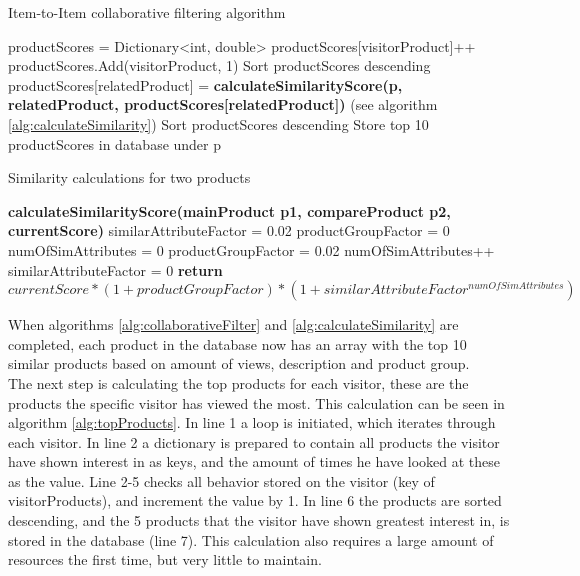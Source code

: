 \begin{algorithm}[H]
\caption{Item-to-Item collaborative filtering algorithm}
\label{alg:collaborativeFilter}
\begin{algorithmic}[1]
\State productScores = Dictionary<int, double>
\State productScores[visitorProduct]++
\Else
\State productScores.Add(visitorProduct, 1)
\EndIf
\EndFor
\EndFor
\State Sort productScores descending
\State productScores[relatedProduct] =
\State \textbf{calculateSimilarityScore(p, relatedProduct, productScores[relatedProduct])} (see algorithm \ref{alg:calculateSimilarity})
\EndFor
\State Sort productScores descending
\State Store top 10 productScores in database under p
\EndFor
\end{algorithmic}
\end{algorithm}

\begin{algorithm}[H]
\caption{Similarity calculations for two products }
\label{alg:calculateSimilarity}
\begin{algorithmic}[1]

\State \textbf{calculateSimilarityScore(mainProduct p1, compareProduct p2, currentScore)}
\State similarAttributeFactor = 0.02
\State productGroupFactor = 0
\State numOfSimAttributes = 0
\State productGroupFactor = 0.02
\EndIf
{}
\State numOfSimAttributes++
\EndIf
\EndFor
{}
\State similarAttributeFactor = 0
\EndIf
\State \textbf{return} \begin{math} currentScore * (1+productGroupFactor)*(1+similarAttributeFactor^{numOfSimAttributes}) \end{math}
\end{algorithmic}
\end{algorithm}


When algorithms \ref{alg:collaborativeFilter} and \ref{alg:calculateSimilarity} are completed, each product in the database now has an array with the top 10 similar products based on amount of views, description and product group. \\
The next step is calculating the top products for each visitor, these are the products the specific visitor has viewed the most. This calculation can be seen in algorithm \ref{alg:topProducts}. In line 1 a loop is initiated, which iterates through each visitor. In line 2 a dictionary is prepared to contain all products the visitor have shown interest in as keys, and the amount of times he have looked at these as the value. Line 2-5 checks all behavior stored on the visitor (key of visitorProducts), and increment the value by 1. In line 6 the products are sorted descending, and the 5 products that the visitor have shown greatest interest in, is stored in the database (line 7). This calculation also requires a large amount of resources the first time, but very little to maintain.

